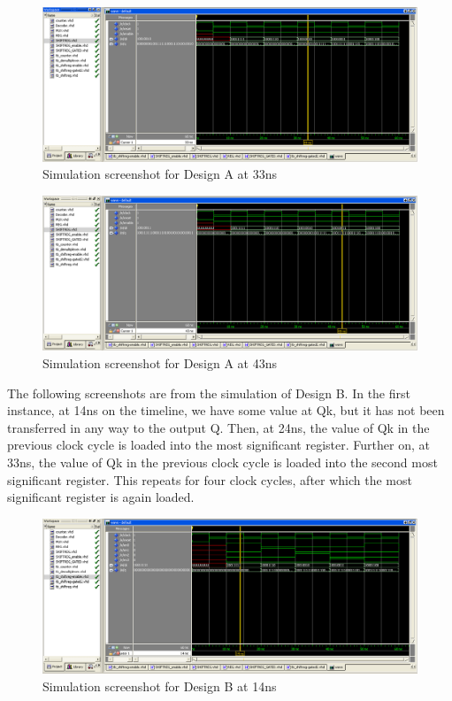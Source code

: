 \documentclass[11pt,a4paper]{article}
\begin{document}
\begin{figure}[htp]
\centering
\includegraphics[length = 4in,width = 6.5in]{./images/simsr1.png}
\caption{Simulation screenshot for Design A at 33ns}
\end{figure}

\begin{figure}[htp]
\centering
\includegraphics[length = 4in,width = 6.5in]{./images/simsr2.png}
\caption{Simulation screenshot for Design A at 43ns}
\end{figure}

\newpage
The following screenshots are from the simulation of Design B. In the first instance, at 14ns on the timeline, we have some value at Qk, but it has not been transferred in any way to the output Q. Then, at 24ns, the value of Qk in the previous clock cycle is loaded into the most significant register. Further on, at 33ns, the value of Qk in the previous clock cycle is loaded into the second most significant register. This repeats for four clock cycles, after which the most significant register is again loaded.

\begin{figure}[htp]
\centering
\includegraphics[length = 4in,width = 6.5in]{./images/simsre1.png}
\caption{Simulation screenshot for Design B at 14ns}
\end{figure}
\end{document}
